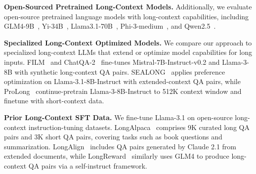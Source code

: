 \textbf{Open-Sourced Pretrained Long-Context Models.}
Additionally, we evaluate open-source pretrained language models with long-context capabilities, including GLM4-9B~\citep{glm2024chatglm}, Yi-34B~\citep{ai2024yi}, Llama3.1-70B~\citep{dubey2024llama}, Phi-3-medium~\citep{abdin2024phi3report}, and Qwen2.5~\citep{qwen2.5report}.

\textbf{Specialized Long-Context Optimized Models.}
We compare our approach to specialized long-context LLMs that extend or optimize model capabilities for long inputs. FILM~\citep{an2024make} and ChatQA-2~\citep{xu2024chatqa} fine-tunes Mistral-7B-Instruct-v0.2 and Llama-3-8B with synthetic long-context QA pairs. SEALONG~\citep{li2024sealong} applies preference optimization on Llama-3.1-8B-Instruct with extended-context QA pairs, while ProLong~\citep{gao2024prolong} continue-pretrain Llama-3-8B-Instruct to 512K context window and finetune with short-context data.

\textbf{Prior Long-Context SFT Data.}
We fine-tune Llama-3.1 on open-source long-context instruction-tuning datasets. LongAlpaca~\citep{chenlonglora} comprises 9K curated long QA pairs and 3K short QA pairs, covering tasks such as book questions and summarization. LongAlign~\citep{bai2024longalign} includes QA pairs generated by Claude 2.1 from extended documents, while LongReward~\citep{zhang2024longreward} similarly uses GLM4 to produce long-context QA pairs via a self-instruct framework.

